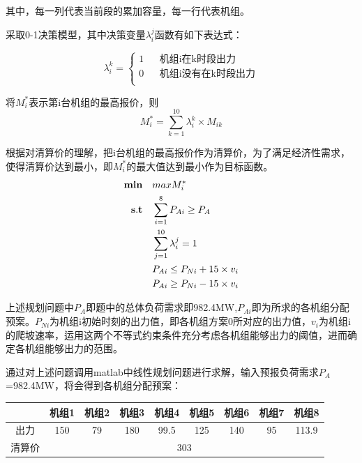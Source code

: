 \documentclass[12pt]{article} %
\begin{document}
	其中，每一列代表当前段的累加容量，每一行代表机组。
	
	采取0-1决策模型，其中决策变量$\lambda_{i}^{j}$函数有如下表达式：
	
	$$ \lambda_{i}^{k}=\left\{
	\begin{array}{rcl}
		1       &      & {\text{机组i在k时段出力}}\\
		0       &      & {\text{机组i没有在k时段出力}}\\
	\end{array} \right. $$
	
	将$M_{i}^{*}$表示第i台机组的最高报价，则
	\begin{equation}
		M_{i}^{*}=\sum_{k=1}^{10} \lambda_{i}^{k} \times M_{ik} 
	\end{equation}
	
	根据对清算价的理解，把i台机组的最高报价作为清算价，为了满足经济性需求，使得清算价达到最小，即$M_{i}^{*}$的最大值达到最小作为目标函数。
	\begin{equation*}
		\begin{split}
			{\bf min}\quad & max M_{i}^{*}\\
			{\bf s.t}\quad &\sum_{i=1}^{8}P_{Ai} \ge P_{A}\\
			&\sum_{j=1}^{10} \lambda_{i}^{j} =1\\
			&P_{Ai} \le P_{Ni} + 15\times v_{i} \\
			&P_{Ai} \ge P_{Ni} - 15\times v_{i} \\
		\end{split}
	\end{equation*}
	
	上述规划问题中$P_{A}$即题中的总体负荷需求即982.4MW,$P_{Ai}$即为所求的各机组分配预案。$P_{Ni}$为机组i初始时刻的出力值，即各机组方案0所对应的出力值，$v_{i}$为机组i的爬坡速率，运用这两个不等式约束条件充分考虑各机组能够出力的阈值，进而确定各机组能够出力的范围。
	
	通过对上述问题调用matlab中线性规划问题进行求解，输入预报负荷需求$P_{A}$=982.4MW，将会得到各机组分配预案：
	
	
	
	
	
	
	\begin{table}[htbp]
		\begin{tabular}{|c|c|c|c|c|c|c|c|c|}
			\hline
			{}    & {机组1} & {机组2} & {机组3} & {机组4} & {机组5} & {机组6} & {机组7} & {机组8} \\ \hline
			{出力}  & 150          & 79           & 180          & 99.5         & 125          & 140          & 95           & 113.9        \\ \hline
			{清算价} & \multicolumn{8}{c|}{303}                                                                                              \\ \hline
		\end{tabular}
	\end{table}
	
\end{document}
